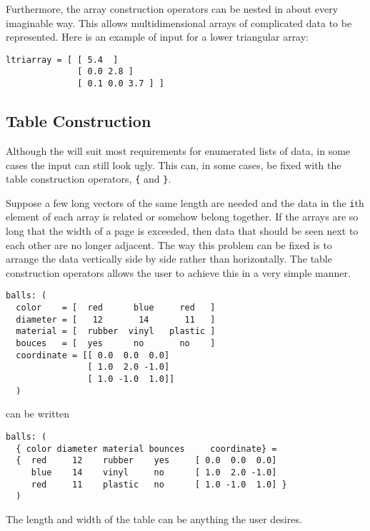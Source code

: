 Furthermore, the array construction operators can be nested in about
every imaginable way.  This allows multidimensional arrays of
complicated data to be represented.  Here is an example of
input for a lower triangular array:
\begin{verbatim}
ltriarray = [ [ 5.4  ]
              [ 0.0 2.8 ]
              [ 0.1 0.0 3.7 ] ]
\end{verbatim}


\subsection{Table Construction}
\label{pkvtable}

Although the  will suit
most requirements for enumerated lists of data, in some cases the input can
still look ugly.  This can, in some cases, be fixed with the table
construction operators, \verb|{| and \verb|}|.

Suppose a few long vectors of the same length are needed and the data in
the \verb|i|th element of each array is related or somehow belong
together.  If the arrays are so long that the width of a page is
exceeded, then data that should be seen next to each other are no longer
adjacent.  The way this problem can be fixed is to arrange the data
vertically side by side rather than horizontally.  The table
construction operators allows the user to achieve this in a very simple
manner.
\begin{verbatim}
balls: (
  color    = [  red      blue     red   ]
  diameter = [   12       14       11   ]
  material = [  rubber  vinyl   plastic ]
  bouces   = [  yes      no       no    ]
  coordinate = [[ 0.0  0.0  0.0]
                [ 1.0  2.0 -1.0]
                [ 1.0 -1.0  1.0]]
  )
\end{verbatim}
can be written
\begin{verbatim}
balls: (
  { color diameter material bounces     coordinate} =
  {  red     12    rubber    yes     [ 0.0  0.0  0.0]
     blue    14    vinyl     no      [ 1.0  2.0 -1.0]
     red     11    plastic   no      [ 1.0 -1.0  1.0] }
  )
\end{verbatim}
The length and width of the table can be anything the user desires.

